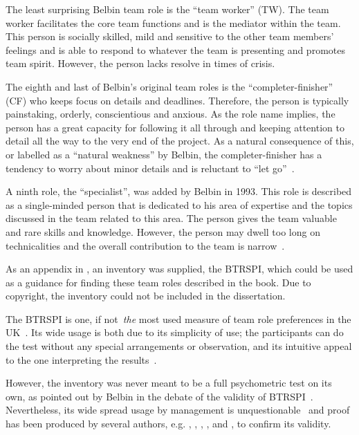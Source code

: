 \documentclass[a4paper,12pt,titlepage]{report}
\begin{document}
  The least surprising Belbin team role is the ``team worker'' (TW).
  The team worker facilitates the core team functions and is the mediator within the
  team. This person is socially skilled, mild and sensitive to the other team members'
  feelings and is able to respond to whatever the team is presenting and promotes
  team spirit. However, the person lacks resolve in times of crisis.

  The eighth and last of Belbin's original team roles is the ``completer-finisher'' (CF)
  who keeps focus on details and deadlines. Therefore, the person is typically
  painstaking, orderly, conscientious and anxious. As the role name implies, the
  person has a great capacity for following it all through and keeping attention
  to detail all the way to the very end of the project. As a natural
  consequence of this, or labelled as a ``natural weakness'' by
  Belbin, the completer-finisher has a
  tendency to worry about minor details and is
  reluctant to ``let go''~\cite[243]{shts}.

  A ninth role, the ``specialist'', was added by Belbin in 1993.
  This role is described as a single-minded person that
  is dedicated to his area of expertise and the topics
  discussed in the team related to this area. The person gives the team
  valuable and rare skills and knowledge. However, the person may
  dwell too long on technicalities and the overall contribution to the team
  is narrow~\citep{rmb2}.

  As an appendix in \citet{rmb}, an inventory was supplied, the BTRSPI,
  which could be used as a guidance for finding these team roles
  described in the book. Due to copyright, the inventory could not
  be included in the dissertation.

  The BTRSPI is one, if not~\emph{the} most used measure of team role 
  preferences in the UK~\cite[33]{sbab}. Its wide usage is both due to
  its simplicity of use; the participants can do the test without
  any special arrangements or observation, and its intuitive
  appeal to the one interpreting the results~\cite[66]{sfwmgs}.

  However, the inventory was never meant to be a
  full psychometric test on its own, as pointed out by Belbin in the debate of the
  validity of BTRSPI~\cite[259-260]{rmb3}. Nevertheless, its
  wide spread usage by management is unquestionable~\cite[33]{sbab} and proof has
  been produced by several authors, e.g. \citet{sfthwm3},
  \citet{sfwmjw}, \citet{sstm}, \citet{bwmg}, \citet{ysht} and
  \citet{jssd}, to confirm its validity.
\end{document}
